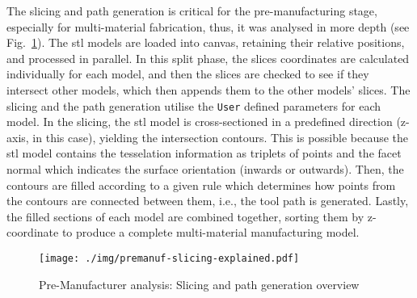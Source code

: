 The slicing and path generation is critical for the pre-manufacturing stage,
especially for multi-material fabrication,
thus, it was analysed in more depth (see
Fig.~\ref{fig:premanuf-slicing-explained}). The \gls{stl} models are loaded into
canvas, retaining their relative positions, and processed in parallel. In this
split phase, the slices coordinates are calculated individually for each model,
and then the slices are checked to see if they intersect other models, which
then appends them to the other models' slices.
The slicing and the path
generation utilise the \texttt{User} defined parameters for each model. In the
slicing, the \gls{stl} model is cross-sectioned in a predefined direction
(z-axis, in this case), yielding the intersection contours. This is possible
because the \gls{stl} model contains the tesselation information as triplets of
points and the facet normal which indicates the surface orientation (inwards or
outwards). Then, the contours are filled according to a given rule which
determines how points from the contours are connected between them, i.e., the
tool path is generated. Lastly, the filled sections of each model are combined
together, sorting them by z-coordinate to produce a complete multi-material
manufacturing model.

\begin{figure}[!hbt]
  \centering
    \texttt{[image: ./img/premanuf-slicing-explained.pdf]}
  \caption{Pre-Manufacturer analysis: Slicing and path generation overview}\label{fig:premanuf-slicing-explained}
\end{figure}

